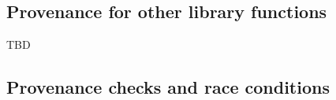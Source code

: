 \documentclass[acmsmall,review,screen]{acmart}\settopmatter{printfolios=true,printccs=false,printacmref=false}
\begin{document}
\subsection{Provenance for other library functions}
TBD

\subsection{Provenance checks and race conditions}





\end{document}
